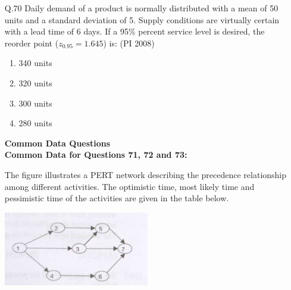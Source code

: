 \documentclass[journal,12pt,onecolumn]{IEEEtran}
\theoremstyle{remark}
\begin{document}
\begin{enumerate}
\begin{multicols}{4}
    \begin{enumerate}[label=(\Alph*)]
\item  P-1, Q-3, R-4, S-2 
\item P-2, Q-1, R-3, S-4 
\item P-1, Q-4, R-3, S-2 
\item P-1, Q-2, R-3, S-4

 \end{enumerate}
\end{multicols}
\vspace{1cm}
\item[\textnormal{Q.70}]
Daily demand of a product is normally distributed with a mean of 50 units and a standard deviation of 5. Supply conditions are virtually certain with a lead time of 6 days. If a 95\% percent service level is desired, the reorder point ($z_{0.95} = 1.645$) is:
\hfill{(PI 2008)}
\begin{multicols}{4}
    \begin{enumerate}[label=(\Alph*)]
\item  340 units 
\item  320 units 
\item  300 units
\item  280 units

 \end{enumerate}
\end{multicols}
\vspace{1cm}

\textbf{Common Data Questions}\\
\textbf{Common Data for Questions 71, 72 and 73:}  

The figure illustrates a PERT network describing the precedence relationship among different activities.  
The optimistic time, most likely time and pessimistic time of the activities are given in the table below.

\begin{center}
    \includegraphics[width=0.5\textwidth]{figures/71-73-pi-2008-gate.png}
\end{center}


\end{enumerate}
\end{document}
